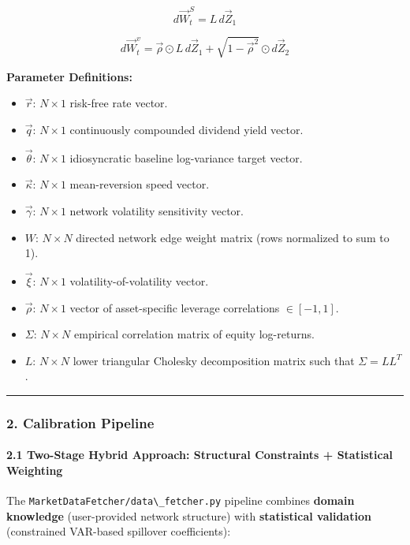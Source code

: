 \documentclass[
]{article}
\newcommand{\passthrough}[1]{#1}
\providecommand{\tightlist}{%
  \setlength{\itemsep}{0pt}\setlength{\parskip}{0pt}}
\begin{document}
\[d\vec{W}_t^S = L \, d\vec{Z}_1\]

\[d\vec{W}_t^v = \vec{\rho} \odot L \, d\vec{Z}_1 + \sqrt{1 - \vec{\rho}^2} \odot d\vec{Z}_2\]

\textbf{Parameter Definitions:}

\begin{itemize}
\tightlist
\item
  \(\vec{r}\): \(N \times 1\) risk-free rate vector.
\item
  \(\vec{q}\): \(N \times 1\) continuously compounded dividend yield
  vector.
\item
  \(\vec{\theta}\): \(N \times 1\) idiosyncratic baseline log-variance
  target vector.
\item
  \(\vec{\kappa}\): \(N \times 1\) mean-reversion speed vector.
\item
  \(\vec{\gamma}\): \(N \times 1\) network volatility sensitivity
  vector.
\item
  \(W\): \(N \times N\) directed network edge weight matrix (rows
  normalized to sum to 1).
\item
  \(\vec{\xi}\): \(N \times 1\) volatility-of-volatility vector.
\item
  \(\vec{\rho}\): \(N \times 1\) vector of asset-specific leverage
  correlations \(\in [-1, 1]\).
\item
  \(\Sigma\): \(N \times N\) empirical correlation matrix of equity
  log-returns.
\item
  \(L\): \(N \times N\) lower triangular Cholesky decomposition matrix
  such that \(\Sigma = LL^T\).
\end{itemize}

\begin{center}\rule{0.5\linewidth}{0.5pt}\end{center}

\subsubsection{2. Calibration Pipeline}\label{calibration-pipeline}

\paragraph{2.1 Two-Stage Hybrid Approach: Structural Constraints +
Statistical
Weighting}\label{two-stage-hybrid-approach-structural-constraints-statistical-weighting}

The \passthrough{\lstinline!MarketDataFetcher/data\_fetcher.py!}
pipeline combines \textbf{domain knowledge} (user-provided network
structure) with \textbf{statistical validation} (constrained VAR-based
spillover coefficients):
\end{document}
